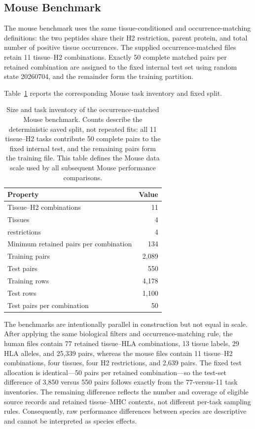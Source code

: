 \subsection{Mouse Benchmark}

The mouse benchmark uses the same tissue-conditioned and occurrence-matching definitions: the two peptides share their H2 restriction, parent protein, and total number of positive tissue occurrences. The supplied occurrence-matched files retain 11 tissue--H2 combinations. Exactly 50 complete matched pairs per retained combination are assigned to the fixed internal test set using random state 20260704, and the remainder form the training partition.

Table~\ref{tab:mouse-benchmark-stats} reports the corresponding Mouse task inventory and fixed split.

\begin{table}[b]
\centering
\caption{Size and task inventory of the occurrence-matched Mouse benchmark. Counts describe the deterministic saved split, not repeated fits: all 11 tissue--H2 tasks contribute 50 complete pairs to the fixed internal test, and the remaining pairs form the training file. This table defines the Mouse data scale used by all subsequent Mouse performance comparisons.}
\label{tab:mouse-benchmark-stats}
\small
\begin{tabularx}{\columnwidth}{@{}>{\raggedright\arraybackslash}Xr@{}}
\toprule
Property & Value \\
\midrule
Tissue--H2 combinations & 11 \\
Tissues & 4 \\
\plainHtwo{} restrictions & 4 \\
Minimum retained pairs per combination & 134 \\
Training pairs & 2,089 \\
Test pairs & 550 \\
Training rows & 4,178 \\
Test rows & 1,100 \\
Test pairs per combination & 50 \\
\bottomrule
\end{tabularx}
\end{table}

The benchmarks are intentionally parallel in construction but not equal in scale. After applying the same biological filters and occurrence-matching rule, the human files contain 77 retained tissue--HLA combinations, 13 tissue labels, 29 HLA alleles, and 25,339 pairs, whereas the mouse files contain 11 tissue--H2 combinations, four tissues, four H2 restrictions, and 2,639 pairs. The fixed test allocation is identical---50 pairs per retained combination---so the test-set difference of 3,850 versus 550 pairs follows exactly from the 77-versus-11 task inventories. The remaining difference reflects the number and coverage of eligible source records and retained tissue--MHC contexts, not different per-task sampling rules. Consequently, raw performance differences between species are descriptive and cannot be interpreted as species effects.
